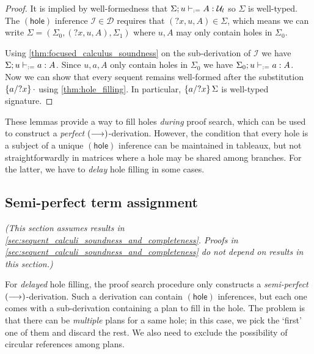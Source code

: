\documentclass[twoside]{report}
\begin{document}
\begin{proof}
It is implied by well-formedness that $\Sigma; u \vdashd A : \mathcal U_l$ so $\Sigma$ is well-typed. The $(\mathsf{hole})$ inference $\mathcal I \in \mathcal D$ requires that $({?x}, u, A) \in \Sigma$, which means we can write $\Sigma = (\Sigma_0, ({?x}, u, A), \Sigma_1)$ where $u, A$ may only contain holes in $\Sigma_0$.

Using \cref{thm:focused_calculus_soundness} on the sub-derivation of $\mathcal I$ we have $\Sigma; u \vdashd a : A$. Since $u, a, A$ only contain holes in $\Sigma_0$ we have $\Sigma_0; u \vdashd a : A$. Now we can show that every sequent remains well-formed after the substitution $\subst {?x} {a} \cdot$ using \cref{thm:hole_filling}. In particular, $\subst {?x} {a} \Sigma$ is well-typed signature.
\end{proof}

These lemmas provide a way to fill holes \emph{during} proof search, which can be used to construct a \emph{perfect} $(\vdashf)$-derivation. However, the condition that every hole is a subject of a unique $(\mathsf{hole})$ inference can be maintained in tableaux, but not straightforwardly in matrices where a hole may be shared among branches. For the latter, we have to \emph{delay} hole filling in some cases.

\subsection*{Semi-perfect term assignment}

\emph{(This section assumes results in \cref{sec:sequent_calculi_soundness_and_completeness}. Proofs in \cref{sec:sequent_calculi_soundness_and_completeness} do not depend on results in this section.)}

For \emph{delayed} hole filling, the proof search procedure only constructs a \emph{semi-perfect} $(\vdashf)$-derivation. Such a derivation can contain $(\mathsf{hole})$ inferences, but each one comes with a sub-derivation containing a plan to fill in the hole. The problem is that there can be \emph{multiple} plans for a same hole; in this case, we pick the `first' one of them and discard the rest. We also need to exclude the possibility of circular references among plans.
\end{document}

